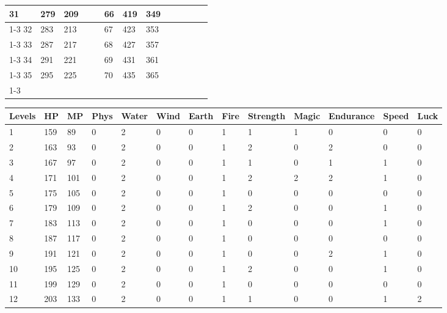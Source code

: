 \begin{table}[!h]
\begin{tabular}{|l|l|l|ll|l|l|l|lllll}
		31 & 279 & 209 &  &  & 66 & 419 & 349 &  &  &  &  &  \\ \cline{1-3} \cline{6-8}
		32 & 283 & 213 &  &  & 67 & 423 & 353 &  &  &  &  &  \\ \cline{1-3} \cline{6-8}
		33 & 287 & 217 &  &  & 68 & 427 & 357 &  &  &  &  &  \\ \cline{1-3} \cline{6-8}
		34 & 291 & 221 &  &  & 69 & 431 & 361 &  &  &  &  &  \\ \cline{1-3} \cline{6-8}
		35 & 295 & 225 &  &  & 70 & 435 & 365 &  &  &  &  &  \\ \cline{1-3} \cline{6-8}
	\end{tabular}
\end{table}
\clearpage

\begin{sidewaystable}[!h]
	\centering
	\caption{Hasil keseluruh data \textit{stats} pada pemain (Bag. 1).}
	\label{tb:player_all_stats_1}
	\vspace{1ex}
	\begin{tabular}{|l|l|l|l|l|l|l|l|l|l|l|l|l|}
		\hline
		\rowcolor[HTML]{C0C0C0} 
		\textbf{Levels} & \textbf{HP} & \textbf{MP} & \textbf{Phys} & \textbf{Water} & \textbf{Wind} & \textbf{Earth} & \textbf{Fire} & \textbf{Strength} & \textbf{Magic} & \textbf{Endurance} & \textbf{Speed} & \textbf{Luck} \\ \hline
		1 & 159 & 89 & 0 & 2 & 0 & 0 & 1 & 1 & 1 & 0 & 0 & 0 \\ \hline
		2 & 163 & 93 & 0 & 2 & 0 & 0 & 1 & 2 & 0 & 2 & 0 & 0 \\ \hline
		3 & 167 & 97 & 0 & 2 & 0 & 0 & 1 & 1 & 0 & 1 & 1 & 0 \\ \hline
		4 & 171 & 101 & 0 & 2 & 0 & 0 & 1 & 2 & 2 & 2 & 1 & 0 \\ \hline
		5 & 175 & 105 & 0 & 2 & 0 & 0 & 1 & 0 & 0 & 0 & 0 & 0 \\ \hline
		6 & 179 & 109 & 0 & 2 & 0 & 0 & 1 & 2 & 0 & 0 & 1 & 0 \\ \hline
		7 & 183 & 113 & 0 & 2 & 0 & 0 & 1 & 0 & 0 & 0 & 1 & 0 \\ \hline
		8 & 187 & 117 & 0 & 2 & 0 & 0 & 1 & 0 & 0 & 0 & 0 & 0 \\ \hline
		9 & 191 & 121 & 0 & 2 & 0 & 0 & 1 & 0 & 0 & 2 & 1 & 0 \\ \hline
		10 & 195 & 125 & 0 & 2 & 0 & 0 & 1 & 2 & 0 & 0 & 1 & 0 \\ \hline
		11 & 199 & 129 & 0 & 2 & 0 & 0 & 1 & 0 & 0 & 0 & 0 & 0 \\ \hline
		12 & 203 & 133 & 0 & 2 & 0 & 0 & 1 & 1 & 0 & 0 & 1 & 2 \\ \hline

\end{tabular}
\end{sidewaystable}
